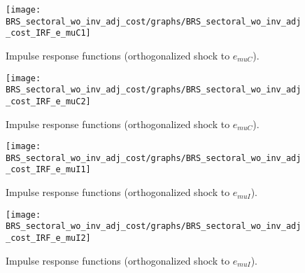 \begin{figure}[H]
\centering 
\texttt{[image: BRS\_sectoral\_wo\_inv\_adj\_cost/graphs/BRS\_sectoral\_wo\_inv\_adj\_cost\_IRF\_e\_muC1]}
\caption{Impulse response functions (orthogonalized shock to ${e_{muC}}$).}\label{Fig:IRF:e_muC:1}
\end{figure}
 
\begin{figure}[H]
\centering 
\texttt{[image: BRS\_sectoral\_wo\_inv\_adj\_cost/graphs/BRS\_sectoral\_wo\_inv\_adj\_cost\_IRF\_e\_muC2]}
\caption{Impulse response functions (orthogonalized shock to ${e_{muC}}$).}\label{Fig:IRF:e_muC:2}
\end{figure}
 
\begin{figure}[H]
\centering 
\texttt{[image: BRS\_sectoral\_wo\_inv\_adj\_cost/graphs/BRS\_sectoral\_wo\_inv\_adj\_cost\_IRF\_e\_muI1]}
\caption{Impulse response functions (orthogonalized shock to ${e_{muI}}$).}\label{Fig:IRF:e_muI:1}
\end{figure}
 
\begin{figure}[H]
\centering 
\texttt{[image: BRS\_sectoral\_wo\_inv\_adj\_cost/graphs/BRS\_sectoral\_wo\_inv\_adj\_cost\_IRF\_e\_muI2]}
\caption{Impulse response functions (orthogonalized shock to ${e_{muI}}$).}\label{Fig:IRF:e_muI:2}
\end{figure}
 
 
